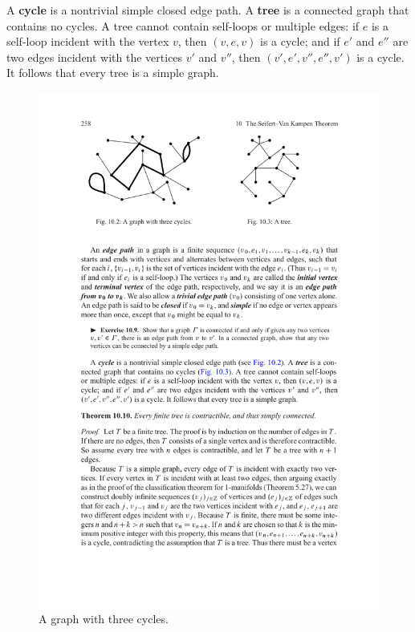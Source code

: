 A \textbf{cycle} is a nontrivial simple closed edge path. A \textbf{tree} is a connected graph that contains no cycles. A tree cannot contain self-loops or multiple edges: if $e$ is a self-loop incident with the vertex $v$, then $(v,e,v)$ is a cycle; and if $e'$ and $e''$ are two edges incident with the vertices $v'$ and $v''$, then $(v',e',v'',e'',v')$ is a cycle. It follows that every tree is a simple graph.
\begin{figure}[htpb]
\centering
\begin{minipage}{200pt}
\centering
\includegraphics{Graph-eg1}
\caption{A graph with three cycles.}
\end{minipage}
\hspace{20pt}
\begin{minipage}{200pt}
\centering

\end{minipage}
\end{figure}
